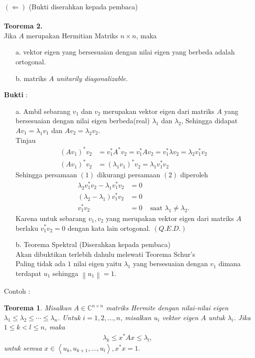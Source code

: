 \documentclass[11pt,a4paper]{article}
\theoremstyle{plain}
\newtheorem{theorem}{Teorema}[section]
\theoremstyle{definition}
\theoremstyle{remark}
\begin{document}
\begin{enumerate}
	$(\Leftarrow)$ (Bukti diserahkan kepada pembaca)\\
	\\
	\textbf{Teorema 2.}\\
	Jika $A$ merupakan Hermitian Matriks $n\times n$, maka
	\begin{enumerate}
		\item[a.] vektor eigen yang bersesuaian dengan nilai eigen yang berbeda adalah ortogonal.
		\item[b.] matriks $A$ \textit{unitarily diagonalizable}.
	\end{enumerate}
	\textbf{Bukti} :\\
	\begin{enumerate}
		\item[a.] Ambil sebarang $v_{1}$ dan $v_{2}$ merupakan vektor eigen dari matriks $A$ yang bersesuaian dengan nilai eigen berbeda(real) $\lambda_{1}$ dan $\lambda_{2}$, Sehingga didapat $Av_{1}=\lambda_{1}v_{1}$ dan $Av_{2}=\lambda_{2}v_{2}$.\\
		Tinjau
		\begin{align}
		(Av_{1})^*v_{2}&=v_{1}^*A^*v_{2}=v_{1}^*Av_{2}=v_{1}^*\lambda v_{2}=\lambda_{2}v_{1}^*v_{2} \\
		(Av_{1})^*v_{2}&=(\lambda_{1} v_{1})^*v_{2} = \lambda_{1} v_{1}^* v_{2}
		\end{align} 
		Sehingga persamaan $(1)$ dikurangi persamaan $(2)$ diperoleh
		\begin{align*}
		\lambda_{2}v_{1}^*v_{2}-\lambda_{1} v_{1}^* v_{2} &= 0\\
		(\lambda_{2}-\lambda_{1})v_{1}^*v_{2} &=0\\
		v_{1}^*v_{2} &=0  & \text{ saat } \lambda_{1}\ne \lambda_{2}.
		\end{align*}
		Karena untuk sebarang $v_{1}, v_{2}$ yang merupakan vektor eigen dari matriks $A$ berlaku $v_{1}^*v_{2}=0$ dengan kata lain ortogonal. $(Q.E.D.)$ 
		\item[b.] Teorema Spektral (Diserahkan kepada pembaca)\\
		Akan dibuktikan terlebih dahulu melewati Teorema Schur's\\
		Paling tidak ada $1$ nilai eigen yaitu $\lambda_{1}$ yang bersesuaian dengan $v_{1}$ dimana terdapat $u_{1}$ sehingga $\left\|u_{1}\right\|=1$.
	\end{enumerate}
	Contoh :\\
	
	\newpage
	
	\begin{bfseries}
		\begin{theorem}
			Misalkan $A\in \mathbb{C}^{n\times n}$ matriks Hermite dengan nilai-nilai eigen $\lambda_{1}\le \lambda_{2}\le \cdots\le \lambda_{n}$. Untuk $i=1,2,\ldots ,n$, misalkan $u_{i}$ vektor eigen $A$ untuk $\lambda_{i}$. Jika $1\le k<l\le n$, maka
			\begin{align*}
			\lambda_{k} \le x^{\ast} A x \le \lambda_{l},
			\end{align*}
			untuk semua $x\in \left\langle u_{k},u_{k+1},\ldots ,u_{l} \right \rangle, x^{\ast}x = 1.$
		\end{theorem}
	\end{bfseries}
	

\end{enumerate}
\end{document}

